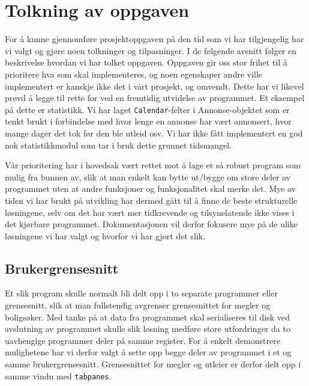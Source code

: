 \section{Tolkning av oppgaven}
For å kunne gjennomføre prosjektoppgaven på den tid som vi har tilgjengelig har vi valgt og gjøre noen tolkninger og tilpasninger. I de følgende avsnitt følger en beskrivelse hvordan vi har tolket oppgaven.
Oppgaven gir oss stor frihet til å prioritere hva som skal implementeres, og noen egenskaper andre ville implementert er kanskje ikke det i vårt prosjekt, og omvendt. Dette har vi likevel prøvd å legge til rette for ved en fremtidig utvidelse av programmet. 
Et eksempel på dette er statistikk. Vi har laget \texttt{Calendar}-felter i Annonse-objektet som er tenkt brukt i forbindelse med hvor lenge en annonse har vært annonsert, hvor mange dager det tok før den ble utleid osv. Vi har ikke fått implementert en god nok statistikkmodul som tar i bruk dette grunnet tidsmangel.

Vår prioritering har i hovedsak vært rettet mot å lage et så robust program som mulig fra bunnen av, slik at man enkelt kan bytte ut/bygge om store deler av programmet uten at andre funksjoner og funksjonalitet skal merke det.
Mye av tiden vi har brukt på utvikling har dermed gått til å finne de beste strukturelle løsningene, selv om det har vært mer tidkrevende og tilsynelatende ikke vises i det kjørbare programmet. 
Dokumentasjonen vil derfor fokusere mye på de ulike løsningene vi har valgt og hvorfor vi har gjort det slik.

\subsection{Brukergrensesnitt}
Et slik program skulle normalt bli delt opp i to separate programmer eller grensesnitt, slik at man fullstendig avgrenser grensesnittet for megler og boligsøker. Med tanke på at data fra programmet skal serialiseres til disk ved avslutning av programmet skulle slik løsning medføre store utfordringer da to uavhengige programmer deler på samme register. For å enkelt demonstrere mulighetene har vi derfor valgt å sette opp begge deler av programmet i et og samme brukergrensesnitt. Grensesnittet for megler og utleier er derfor delt opp i samme vindu med \texttt{tabpanes}. 

